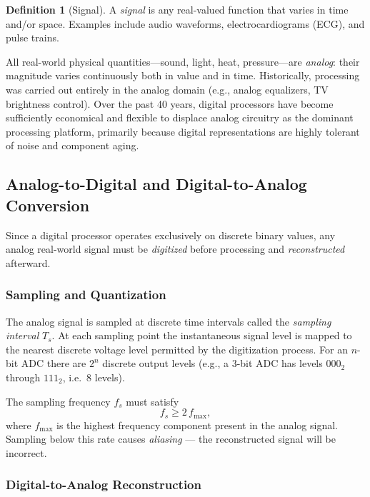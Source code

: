 \documentclass[11pt, a4paper, notitlepage]{report}
\theoremstyle{definition}
\newtheorem{definition}[theorem]{Definition}
\theoremstyle{remark}
\theoremstyle{definition}
\begin{document}
\begin{definition}[Signal]
  \label{def:signal}
  A \emph{signal} is any real-valued function that varies in time and/or space. Examples include audio waveforms, electrocardiograms (ECG), and pulse trains.
\end{definition}

All real-world physical quantities—sound, light, heat, pressure—are \emph{analog}: their magnitude varies continuously both in value and in time. Historically, processing was carried out entirely in the analog domain (e.g., analog equalizers, TV brightness control). Over the past 40 years, digital processors have become sufficiently economical and flexible to displace analog circuitry as the dominant processing platform, primarily because digital representations are highly tolerant of noise and component aging.

\subsection{Analog-to-Digital and Digital-to-Analog Conversion}
\label{sec:adc-dac}

Since a digital processor operates exclusively on discrete binary values, any analog real-world signal must be \emph{digitized} before processing and \emph{reconstructed} afterward.

\subsubsection{Sampling and Quantization}

The analog signal is sampled at discrete time intervals called the \emph{sampling interval} $T_s$. At each sampling point the instantaneous signal level is mapped to the nearest discrete voltage level permitted by the digitization process. For an $n$-bit ADC there are $2^n$ discrete output levels (e.g., a 3-bit ADC has levels $000_2$ through $111_2$, i.e.\ 8 levels).

\begin{keyresult}[title={Key Result: Nyquist Sampling Theorem}]
  The sampling frequency $f_s$ must satisfy
  \[
    f_s \geq 2\,f_{\max},
  \]
  where $f_{\max}$ is the highest frequency component present in the analog signal. Sampling below this rate causes \emph{aliasing} — the reconstructed signal will be incorrect.
\end{keyresult}

\subsubsection{Digital-to-Analog Reconstruction}
\end{document}
